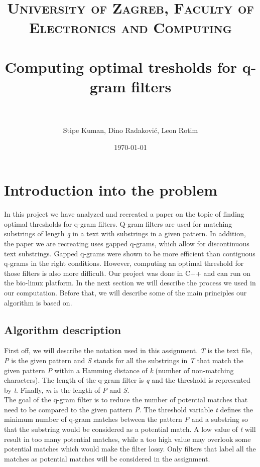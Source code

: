 \documentclass[paper=a4, fontsize=11pt]{scrartcl} %
\title{	
\normalfont \normalsize 
\textsc{University of Zagreb, Faculty of Electronics and Computing} \\ [25pt] %
\horrule{0.5pt} \\[0.4cm] %
\huge Computing optimal tresholds for q-gram filters \\ %
\horrule{2pt} \\[0.5cm] %
}
\author{Stipe Kuman, Dino Radaković, Leon Rotim} %
\date{\normalsize\today} %
\numberwithin{equation}{section} %
\numberwithin{figure}{section} %
\numberwithin{table}{section} %
\begin{document}
\maketitle %


\section{Introduction into the problem}

In this project we have analyzed and recreated a paper on the topic of finding optimal thresholds for q-gram filters. Q-gram filters
are used for matching substrings of length \textit{q} in a text with substrings in a given pattern. In addition, the paper we are recreating
uses gapped q-grams, which allow for discontinuous text substrings. Gapped q-grams were shown to be more efficient than 
contiguous q-grams in the right conditions. However, computing an optimal threshold for those filters is also more difficult. 
Our project was done in C++ and can run on the bio-linux platform.
In the next section we will describe the process we used in our computation. Before that, we will describe some of the main
principles our algorithm is based on.  %



\subsection{Algorithm description}

First off, we will describe the notation used in this assignment. \textit{T} is the text file, \textit{P} is the given pattern and \textit{S} stands 
for all the substrings in \textit{T} that match the given pattern \textit{P} within a Hamming distance of \textit{k} (number of non-matching characters). 
The length of the q-gram filter is \textit{q} and the threshold is represented by \textit{t}. Finally, \textit{m} is the length of \textit{P} and \textit{S}. \\
The goal of the q-gram filter is to reduce the number of potential matches that need to be compared to the given pattern \textit{P}. 
The threshold variable \textit{t} defines the minimum number of q-gram matches between the pattern \textit{P} and 
a substring so that the substring would be considered as a potential match. A low value of \textit{t} will result in too many potential matches, 
while a too high value may overlook some potential matches which would make the filter lossy. Only filters that label all the matches as 
potential matches will be considered in the assignment.




\end{document}
